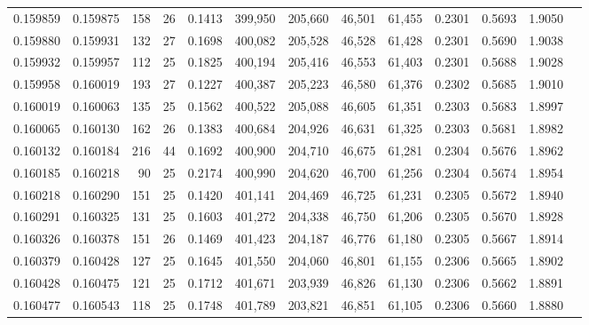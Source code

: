 \begin{tabular}{rrrrrrrrrrrrr}
0.159859 & 0.159875 & 158 &  26 &                                     0.1413 & 399,950 & 205,660 &  46,501 &  61,455 & 0.2301 & 0.5693 & 1.9050 \\
0.159880 & 0.159931 & 132 &  27 &                                     0.1698 & 400,082 & 205,528 &  46,528 &  61,428 & 0.2301 & 0.5690 & 1.9038 \\
0.159932 & 0.159957 & 112 &  25 &                                     0.1825 & 400,194 & 205,416 &  46,553 &  61,403 & 0.2301 & 0.5688 & 1.9028 \\
0.159958 & 0.160019 & 193 &  27 &                                     0.1227 & 400,387 & 205,223 &  46,580 &  61,376 & 0.2302 & 0.5685 & 1.9010 \\
0.160019 & 0.160063 & 135 &  25 &                                     0.1562 & 400,522 & 205,088 &  46,605 &  61,351 & 0.2303 & 0.5683 & 1.8997 \\
0.160065 & 0.160130 & 162 &  26 &                                     0.1383 & 400,684 & 204,926 &  46,631 &  61,325 & 0.2303 & 0.5681 & 1.8982 \\
0.160132 & 0.160184 & 216 &  44 &                                     0.1692 & 400,900 & 204,710 &  46,675 &  61,281 & 0.2304 & 0.5676 & 1.8962 \\
0.160185 & 0.160218 &  90 &  25 &                                     0.2174 & 400,990 & 204,620 &  46,700 &  61,256 & 0.2304 & 0.5674 & 1.8954 \\
0.160218 & 0.160290 & 151 &  25 &                                     0.1420 & 401,141 & 204,469 &  46,725 &  61,231 & 0.2305 & 0.5672 & 1.8940 \\
0.160291 & 0.160325 & 131 &  25 &                                     0.1603 & 401,272 & 204,338 &  46,750 &  61,206 & 0.2305 & 0.5670 & 1.8928 \\
0.160326 & 0.160378 & 151 &  26 &                                     0.1469 & 401,423 & 204,187 &  46,776 &  61,180 & 0.2305 & 0.5667 & 1.8914 \\
0.160379 & 0.160428 & 127 &  25 &                                     0.1645 & 401,550 & 204,060 &  46,801 &  61,155 & 0.2306 & 0.5665 & 1.8902 \\
0.160428 & 0.160475 & 121 &  25 &                                     0.1712 & 401,671 & 203,939 &  46,826 &  61,130 & 0.2306 & 0.5662 & 1.8891 \\
0.160477 & 0.160543 & 118 &  25 &                                     0.1748 & 401,789 & 203,821 &  46,851 &  61,105 & 0.2306 & 0.5660 & 1.8880 \\

\end{tabular}
